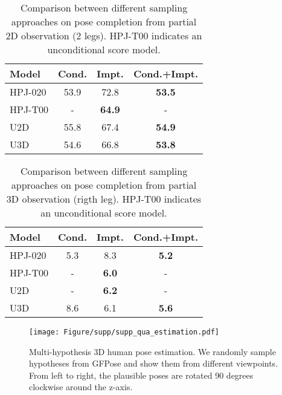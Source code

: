 \documentclass[10pt,twocolumn,letterpaper]{article}
\begin{document}
\begin{table}
    \centering
    \small
\begin{tabular}{l c c c}
            \toprule
            Model & Cond. & Impt. & Cond.+Impt. \\
            \midrule
            HPJ-020 &  53.9 & 72.8 & \textbf{53.5} \\
            HPJ-T00 &  - & \textbf{64.9} & - \\
            U2D &  55.8 & 67.4 & \textbf{54.9} \\
            U3D & 54.6 & 66.8 & \textbf{53.8} \\
            \bottomrule
        \end{tabular}
\caption{Comparison between different sampling approaches on pose completion from partial 2D observation (2 legs). HPJ-T00 indicates an unconditional score model.}
    \label{table:supp_impt_complete_2d}
\end{table}

\begin{table}
    \centering
    \small
\begin{tabular}{l c c c}
            \toprule
            Model & Cond. & Impt. & Cond.+Impt. \\
            \midrule
            HPJ-020 &  5.3 & 8.3 & \textbf{5.2} \\
            HPJ-T00 &  - & \textbf{6.0} & - \\
            U2D &  - & \textbf{6.2} & - \\
            U3D &  8.6 & 6.1 & \textbf{5.6} \\
            \bottomrule
        \end{tabular}
\caption{Comparison between different sampling approaches on pose completion from partial 3D observation (rigth leg). HPJ-T00 indicates an unconditional score model.}
    \label{table:supp_impt_complete_3d}
\end{table}

\begin{figure*}[!t]
    \centering
    \texttt{[image: Figure/supp/supp\_qua\_estimation.pdf]}
\caption{Multi-hypothesis 3D human pose estimation. We randomly sample  hypotheses from GFPose and show them from  different viewpoints. From left to right, the plausible poses are rotated 90 degrees clockwise around the z-axis.}
    \label{fig:supp_qua_estimation}
\end{figure*}
\end{document}
